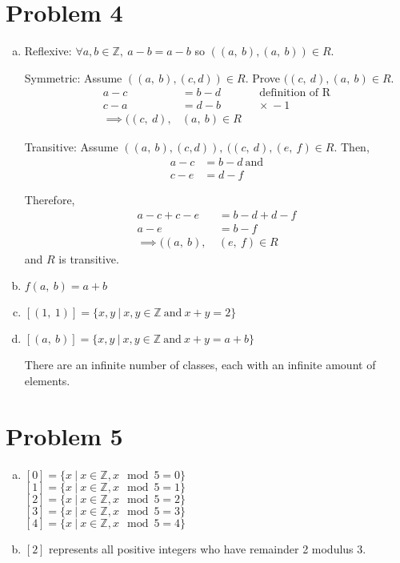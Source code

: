 \documentclass[11pt]{article}
\begin{document}
\section*{Problem 4}
	\begin{enumerate}[(a)]
	\item
		Reflexive: $\forall a,b \in \mathbb{Z},\ a-b=a-b$ so $((a,\ b),	(a,\ b)) 
		\in R$.
		
		Symmetric: Assume $((a,\ b),(c, d)) \in R$. Prove $((c,\ d),(a,\ b) \in 
		R$.
		\begin{align*}
		a-c &= b-d&&\text{definition of R}\\
		c-a &= d-b &&\times\ -1\\
		\implies ((c,\ d),&(a,\ b) \in R
		\end{align*}
		
		Transitive: Assume $((a,\ b),(c, d)),\ ((c,\ d),(e,\ f) \in R$. Then,
		\begin{align*}
		a -c &= b-d\ \text{and}\\
		c-e  &= d-f
		\end{align*}
		
		Therefore,
		\begin{align*}
		a -c + c -e &= b -d + d - f\\
		a -e &= b - f\\
		\implies ((a,\ b),\ &(e,\ f) \in R
		\end{align*}
		and $R$ is transitive.
		
	\item
		$f(a,\ b) = a + b$
	
	\item
		$[(1,\ 1)] = \{x,y\ |\ x,y \in \mathbb{Z}\ \text{and}\ x+y = 2\}$
	\item
		$[(a,\ b)] = \{x,y\ |\ x,y \in \mathbb{Z}\ \text{and}\ x+y = a+b\}$
		
		There are an infinite number of classes, each with an infinite amount of
		elements.
		
		
	\end{enumerate}

\section*{Problem 5}
	\begin{enumerate}[(a)]
	\item
		$[0] = \{x\ |\ x\in \mathbb{Z}, x \mod 5 = 0\} $\\
		$[1] = \{x\ |\ x\in \mathbb{Z}, x \mod 5 = 1\} $\\
		$[2] = \{x\ |\ x\in \mathbb{Z}, x \mod 5 = 2\} $\\
		$[3] = \{x\ |\ x\in \mathbb{Z}, x \mod 5 = 3\} $\\
		$[4] = \{x\ |\ x\in \mathbb{Z}, x \mod 5 = 4\} $
		
	\item
		$[2]$ represents all positive integers who have remainder 2 modulus 3.
	\end{enumerate}		
		
\end{document}
